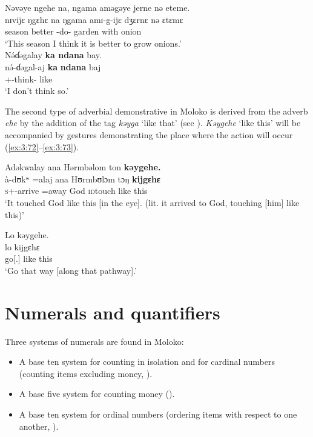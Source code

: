 \ea \label{ex:3:71}
\ea Nəvəye  ngehe  na,  ngama  aməgəye  jerne  nə  eteme.       \\
\gll  nɪvijɛ   ŋgɛhɛ  na   ŋgama    amɪ-g-ijɛ  dʒɛrnɛ  nə      ɛtɛmɛ  \\
      season  {\DEM}    {\PSP}    better   {\DEP}-do-{\CL}  garden  with     onion  \\
\glt  ‘This season I think it is better to grow onions.’        \\
\ex
 N\'{ə}ɗəgalay  \textbf{ka  ndana}  bay.\\
 \gll n\'{ə}-ɗəgal-aj      \textbf{ka}  \textbf{ndana}   baj\\
      {\oneS}+{\IFV}-think-{\CL}  like {\DEM}   {\NEG}\\
 \glt ‘I don’t think so.’
 \z\z

The second type of adverbial demonstrative in Moloko is derived from the adverb \textit{ehe} by the addition of the tag \textit{kəyga} ‘like that’ (see ). \textit{Kəygehe} ‘like this’ will be accompanied by gestures demonstrating the place where the action will occur (\ref{ex:3:72}--\ref{ex:3:73}). 

\ea \label{ex:3:72}
Adəkwalay  ana  Hərmbəlom  ton  \textbf{kəygehe.}\\
\gll  à-dʊkʷ     =alaj  ana  Hʊrmbʊlɔm  tɔŋ    \textbf{kijgɛhɛ}\\
      \textsc{s}+{\PFV}-arrive   =away  {\DAT} God    \textsc{id}touch     {like this}\\
\glt  ‘It touched God like this [in the eye]. (lit. it arrived to God, touching [him] like this)’
\z

\ea \label{ex:3:73}
Lo  kəygehe.\\
\gll lo    kijgɛhɛ\\
      go[{\twoS}.{\IMP}]  {like this}\\
\glt  ‘Go that way [along that pathway].’
\z
{}

\section{Numerals and quantifiers}\label{sec:3.3}
\hypertarget{RefHeading1211021525720847}{}
Three systems of numerals are found in Moloko:

\begin{itemize}
\item A base ten system for counting in isolation and for cardinal numbers (counting items excluding money, ).
\item A base five system for counting money ().
\item A base ten system for ordinal numbers (ordering items with respect to one another, ). 
\end{itemize}
